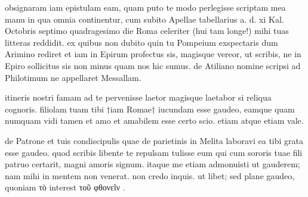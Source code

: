 


 obsignaram iam epistulam eam, quam puto te modo perlegisse scriptam mea manu in qua omnia continentur, cum subito Apellae tabellarius a. d. xi Kal. Octobris septimo quadragesimo die Roma celeriter (hui tam longe!) mihi tuas litteras reddidit. ex quibus non dubito quin tu Pompeium exspectaris dum Arimino rediret et iam in Epirum profectus sis, magisque vereor, ut scribis, ne in Epiro sollicitus sis non minus quam nos hic sumus. de Atiliano nomine scripsi ad Philotimum ne appellaret Messallam.

 itineris nostri famam ad te pervenisse laetor magisque laetabor si reliqua cognoris. filiolam tuam tibi †iam Romae† iucundam esse gaudeo, eamque quam numquam vidi tamen et amo et amabilem esse certo scio. etiam atque etiam vale.

 de Patrone et tuis condiscipulis quae de parietinis in Melita laboravi ea tibi grata esse gaudeo. quod scribis libente te repulsam tulisse eum qui cum sororis tuae fili patruo certarit, magni amoris signum. itaque me etiam admonuisti ut gauderem; nam mihi in mentem non venerat. non credo inquis. ut libet; sed plane gaudeo, quoniam τὸ interest τοῦ φθονεῖν .
